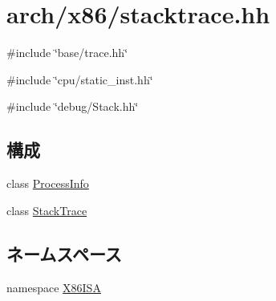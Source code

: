 \hypertarget{x86_2stacktrace_8hh}{
\section{arch/x86/stacktrace.hh}
\label{x86_2stacktrace_8hh}
}
{\ttfamily \#include \char`\"{}base/trace.hh\char`\"{}}\par
{\ttfamily \#include \char`\"{}cpu/static\_\-inst.hh\char`\"{}}\par
{\ttfamily \#include \char`\"{}debug/Stack.hh\char`\"{}}\par
\subsection*{構成}
\begin{DoxyCompactItemize}
\item 
class \hyperlink{classX86ISA_1_1ProcessInfo}{ProcessInfo}
\item 
class \hyperlink{classX86ISA_1_1StackTrace}{StackTrace}
\end{DoxyCompactItemize}
\subsection*{ネームスペース}
\begin{DoxyCompactItemize}
\item 
namespace \hyperlink{namespaceX86ISA}{X86ISA}
\end{DoxyCompactItemize}
